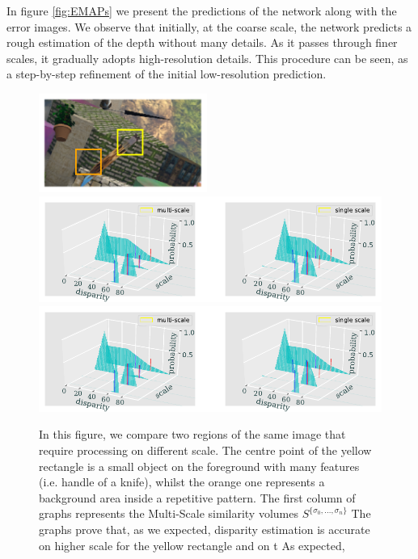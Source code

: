 \documentclass[runningheads]{llncs}
\begin{document}
In figure \ref{fig:EMAPs} we present the predictions of the network along with the error images. We observe that initially, at the coarse scale, the network predicts a rough estimation of the depth without many details. As it passes through finer scales, it gradually adopts high-resolution details. This procedure can be seen, as a step-by-step refinement of the initial low-resolution prediction.

\begin{figure}[t]
    \begin{center}
        \includegraphics[width=0.49\textwidth]{paper/latex/figures/multiscale_importance_image_patches.pdf}\\
        \includegraphics[width=\textwidth]{paper/latex/figures/multiscale_importance_graph_high_resolution.pdf}\\
        \includegraphics[width=\textwidth]{figures/multiscale_importance_graph_high_resolution.pdf}
    \end{center}
    
    \caption{In this figure, we compare two regions of the same image that require processing on different scale. The centre point of the yellow rectangle is a small object on the foreground with many features (i.e. handle of a knife), whilst the orange one represents a background area inside a repetitive pattern. The first column of graphs represents the Multi-Scale similarity volumes $S^{\{ \sigma_0, ..., \sigma_n \} }$ The graphs prove that, as we expected, disparity estimation is accurate on higher scale for the yellow rectangle and on t As expected,  }
    \label{fig:multiscale_importance}
\end{figure}
\end{document}
